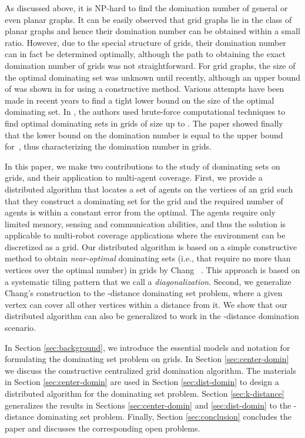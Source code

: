 \documentclass[letterpaper, 10pt, conference]{ieeeconf}
\theoremstyle{definition}
\theoremstyle{remark}
\begin{document}
As discussed above, it is NP-hard to find the domination number of general or even planar graphs. It can be easily observed that grid graphs lie in the class of planar graphs and hence their domination number can be obtained within a small ratio. However, due to the special structure of grids, their domination number can in fact be determined optimally, although the path to obtaining the exact domination number of grids was not straightforward. For  grid graphs, the size of the optimal dominating set was unknown until recently, although an upper bound of  was shown in \cite{TYC'92} for  using a constructive method.  Various attempts have been made in recent years to find a tight lower bound on the size of the optimal dominating set.  In \cite{ACIP'11}, the authors used brute-force computational techniques to find optimal dominating sets in grids of size up to .  The paper \cite{GPRT'11} showed finally that the lower bound on the domination number is equal to the upper bound for~, thus characterizing the domination number in grids.  

In this paper, we make two contributions to the study of dominating sets on grids, and their application to multi-agent coverage. First, we provide a distributed algorithm that locates a set of agents on the vertices of an  grid such that they construct a dominating set for the grid and the required number of agents is within a constant error from the optimal. 
The agents require only limited memory, sensing and communication abilities, and thus the solution is applicable to multi-robot coverage applications where the environment can be discretized as a grid. Our distributed algorithm is based on a simple constructive method to obtain {\it near-optimal} dominating sets (i.e., that require no more than  vertices over the optimal number) in grids by Chang ~\cite{TYC'92}. This  approach is based on a systematic tiling pattern that we call a {\it diagonalization}. Second, we generalize Chang's construction to the -distance dominating set problem, where a given vertex can cover all other vertices within a distance  from it. We show that our distributed algorithm can also be generalized to work in the -distance domination scenario.


In Section \ref{sec:background}, we introduce the essential models and notation for formulating the dominating set problem on grids. In Section \ref{sec:center-domin} we discuss the constructive centralized grid domination algorithm. The materials in Section \ref{sec:center-domin} are used in Section \ref{sec:dist-domin} to design a distributed algorithm for the dominating set problem. Section \ref{sec:k-distance} generalizes the results in Sections \ref{sec:center-domin} and \ref{sec:dist-domin} to the -distance dominating set problem. Finally, Section \ref{sec:conclusion} concludes the paper and discusses the corresponding open problems.
\end{document}
